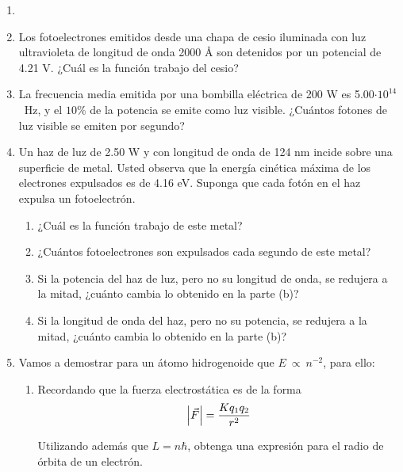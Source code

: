 \documentclass[letterpaper,11pt]{article}
\begin{document}
\vspace{-1cm}
\begin{enumerate}\setlength{\itemsep}{0.4cm}


\item[]

\item Los fotoelectrones emitidos desde una chapa de cesio iluminada con luz ultravioleta de longitud de onda 2000 {\AA} son detenidos por un potencial de 4.21 V. ¿Cuál es la función trabajo del cesio?

\item La frecuencia media emitida por una bombilla eléctrica de 200 W es 5.00$\cdot 10^{14}$~Hz, y el $10\%$ de la potencia se emite como luz visible. ¿Cuántos fotones de luz visible se emiten por segundo?

\item Un haz de luz de 2.50 W y con longitud de onda de 124 nm incide sobre una superficie de metal. Usted observa que la energía cinética máxima de los electrones expulsados es de 4.16 eV. Suponga que cada fotón en el haz expulsa un fotoelectrón.

    \begin{enumerate}
        \item ¿Cuál es la función trabajo de este metal?
        
        \item ¿Cuántos fotoelectrones son expulsados cada segundo de este metal?
        
        \item Si la potencia del haz de luz, pero no su longitud de onda, se redujera a la mitad, ¿cuánto cambia lo obtenido en la parte (b)?
        
        \item Si la longitud de onda del haz, pero no su potencia, se redujera a la mitad, ¿cuánto cambia lo obtenido en la parte (b)?
    \end{enumerate}


\item Vamos a demostrar para un átomo hidrogenoide que $E~\propto~n^{-2}$, para ello:
\begin{enumerate}
    \item Recordando que la fuerza electrostática es de la forma
    $$\abs{\vec{F}} = \frac{K q_1 q_2}{r^2} $$
    
    Utilizando además que $L = n\hbar$, obtenga una expresión para el radio de órbita de un electrón.
    

\end{enumerate}
\end{enumerate}
\end{document}
